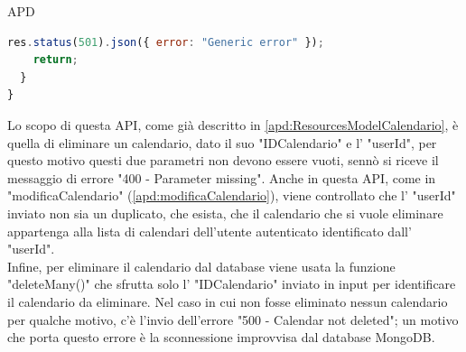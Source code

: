 \begin{listaPersonale} {APD}
\begin{listaPersonale2}[APD]{}
\begin{lstlisting}[language=JavaScript]
    res.status(501).json({ error: "Generic error" });
    return;
  }
}
            \end{lstlisting}
                Lo scopo di questa API, come già descritto in \ref{apd:ResourcesModelCalendario}, è quella di eliminare un calendario, dato il suo "IDCalendario" e l' "userId", per questo motivo questi due parametri non devono essere vuoti, sennò si riceve il messaggio di errore "400 - Parameter missing". Anche in questa API, come in "modificaCalendario" (\ref{apd:modificaCalendario}), viene controllato che l' "userId" inviato non sia un duplicato, che esista, che il calendario che si vuole eliminare appartenga alla lista di calendari dell'utente autenticato identificato dall' "userId". \\
                Infine, per eliminare il calendario dal database viene usata la funzione "deleteMany()" che sfrutta solo l' "IDCalendario" inviato in input per identificare il calendario da eliminare. Nel caso in cui non fosse eliminato nessun calendario per qualche motivo, c'è l'invio dell'errore "500 - Calendar not deleted"; un motivo che porta questo errore è la sconnessione improvvisa dal database MongoDB.

\end{listaPersonale2}
\end{listaPersonale}
